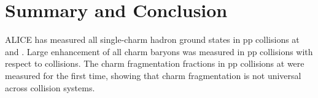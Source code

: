 \chapter{Summary and Conclusion}
ALICE has measured all single-charm hadron ground states in pp collisions at \tevf and \tevt.
Large enhancement of all charm baryons was measured in pp collisions with respect to \ee collisions.
The charm fragmentation fractions in pp collisions at \tevf were measured for the first time, showing that charm fragmentation is not universal across collision systems.